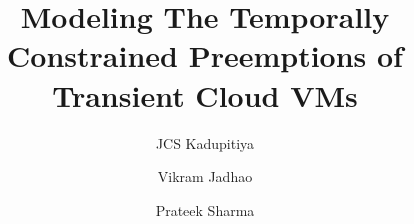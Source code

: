 \documentclass[sigconf]{acmart} %
\begin{document}
\title{Modeling The Temporally Constrained Preemptions of Transient Cloud VMs}

\author{JCS Kadupitiya}
\author{Vikram Jadhao}
\author{Prateek Sharma}

\begin{abstract}
  
\end{abstract}

\maketitle





%





%

%












{


%
}
\end{document}

